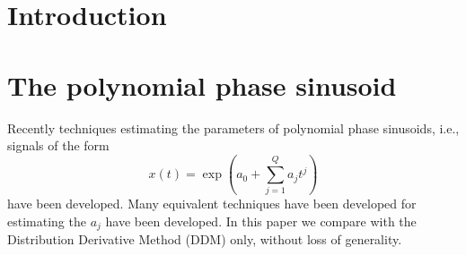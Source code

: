 \documentclass[twoside,a4paper]{article}
\title{\papertitle}
\newif\ifpdf
\begin{document}
\ifpdf %
  \DeclareGraphicsExtensions{.png,.jpg,.pdf}
\else  %
\fi

\maketitle

\begin{abstract}
TODO
\end{abstract}

\section{Introduction}
\label{sec:intro}
%
%
%
\section{The polynomial phase sinusoid}
Recently techniques estimating the parameters of polynomial phase sinusoids,
i.e., signals of the form
\[
    x(t) = \exp(a_0 + \sum_{j=1}^{Q} a_j t^j)
\]
have been developed. Many equivalent techniques have been developed for
estimating the $a_j$ have been developed. In this paper we compare with the
Distribution Derivative Method (DDM) only, without loss of generality.
\end{document}
